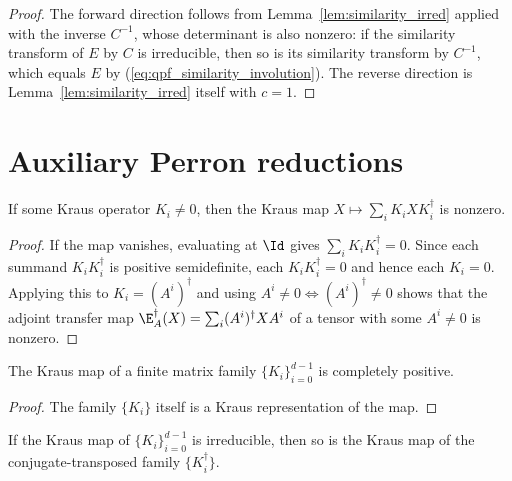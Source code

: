 \begin{proof}\leanok
    The forward direction follows from Lemma~\ref{lem:similarity_irred}
    applied with the inverse $C^{-1}$, whose determinant is also nonzero:
    if the similarity transform of $E$ by $C$ is irreducible, then so is its
    similarity transform by $C^{-1}$, which equals $E$ by
    (\ref{eq:qpf_similarity_involution}). The reverse direction is
    Lemma~\ref{lem:similarity_irred} itself with $c = 1$.
\end{proof}

\section{Auxiliary Perron reductions}
\label{sec:app_qpf_perron}

\begin{theorem}%
    \label{thm:adjoint_transfer_ne_zero}
    \leanok
    If some Kraus operator $K_i \neq 0$, then the Kraus map
    $X \mapsto \sum_i K_i X K_i^\dagger$ is nonzero.
\end{theorem}

\begin{proof}\leanok
    If the map vanishes, evaluating at $\Id$ gives
    $\sum_i K_i K_i^\dagger = 0$.
    Since each summand $K_i K_i^\dagger$ is positive semidefinite,
    each $K_i K_i^\dagger = 0$ and hence each $K_i = 0$.
    Applying this to $K_i = (A^i)^\dagger$ and using
    $A^i \neq 0 \iff (A^i)^\dagger \neq 0$ shows that the adjoint transfer
    map $\E_A^\dagger(X) = \sum_i (A^i)^\dagger X A^i$ of a tensor with some
    $A^i \neq 0$ is nonzero.
\end{proof}

\begin{theorem}%
    \label{thm:kraus_map_cp}
    \leanok
    The Kraus map of a finite matrix family $\{K_i\}_{i=0}^{d-1}$ is
    completely positive.
\end{theorem}

\begin{proof}\leanok
    The family $\{K_i\}$ itself is a Kraus representation of the map.
\end{proof}

\begin{theorem}%
    \label{thm:kraus_conjTranspose_irreducible}
    \leanok
    If the Kraus map of $\{K_i\}_{i=0}^{d-1}$ is irreducible, then so is the
    Kraus map of the conjugate-transposed family $\{K_i^\dagger\}$.
\end{theorem}

